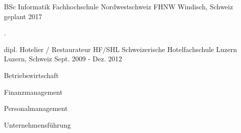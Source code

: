 \begin{cventries}
  \cventry
    {BSc Informatik}
    {Fachhochschule Nordwestschweiz FHNW}
    {Windisch, Schweiz}
    {geplant 2017}
    {
      \begin{cvitems}
        \item {.}
      \end{cvitems}
    }
  \cventry
    {dipl. Hotelier / Restaurateur HF/SHL}
    {Schweizerische Hotelfachschule Luzern}
    {Luzern, Schweiz}
    {Sept. 2009 - Dez. 2012}
    {
      \begin{cvitems}
        \item {Betriebswirtschaft}
        \item {Finanzmanagement}
        \item {Personalmanagement}
        \item {Unternehmensführung}
      \end{cvitems}
    }
\end{cventries}
